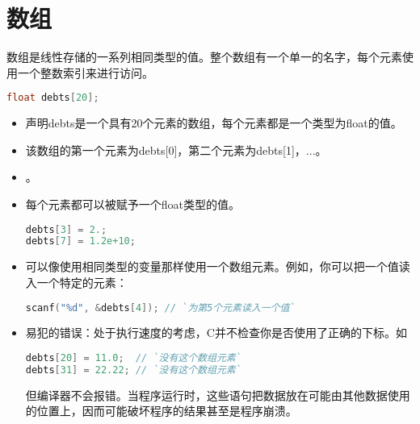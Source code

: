 \section{数组}
\begin{frame}[fragile]\ft{\secname}
数组是线性存储的一系列相同类型的值。整个数组有一个单一的名字，每个元素使用一个整数索引来进行访问。
\end{frame}

\begin{frame}[fragile]
\begin{lstlisting}[language=c,backgroundcolor=\color{red!10}]
float debts[20];
\end{lstlisting}

\begin{itemize}
\item
声明debts是一个具有20个元素的数组，每个元素都是一个类型为float的值。\\[0.1in]
\item
该数组的第一个元素为debts[0]，第二个元素为debts[1]，...。\\[0.1in]
\item
{}。\\[0.1in]
\item 每个元素都可以被赋予一个float类型的值。
\begin{lstlisting}[language=c,backgroundcolor=\color{red!10}]
debts[3] = 2.;
debts[7] = 1.2e+10;
\end{lstlisting}
\end{itemize}
\end{frame}

\begin{frame}[fragile]\ft{\secname}
\begin{itemize}
\item
可以像使用相同类型的变量那样使用一个数组元素。例如，你可以把一个值读入一个特定的元素：
\begin{lstlisting}[language=c,backgroundcolor=\color{red!10}]
scanf("%d", &debts[4]); // `为第5个元素读入一个值`
\end{lstlisting} 
\end{itemize}

\end{frame}

\begin{frame}[fragile]\ft{\secname}
\begin{itemize}
\item
易犯的错误：处于执行速度的考虑，C并不检查你是否使用了正确的下标。如
\begin{lstlisting}[language=c,backgroundcolor=\color{red!10}]
debts[20] = 11.0;  // `没有这个数组元素`
debts[31] = 22.22; // `没有这个数组元素`
\end{lstlisting}
但编译器不会报错。当程序运行时，这些语句把数据放在可能由其他数据使用的位置上，因而可能破坏程序的结果甚至是程序崩溃。
\end{itemize}
\end{frame}

